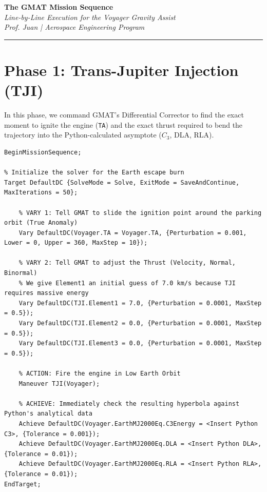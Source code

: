 \documentclass[11pt, letterpaper]{article}
\begin{document}
\begin{center}
    {\Large \textbf{The GMAT Mission Sequence}} \\
    \vspace{0.2cm}
    {\large \textit{Line-by-Line Execution for the Voyager Gravity Assist}} \\
    \vspace{0.4cm}
    \textit{Prof. Juan | Aerospace Engineering Program}
\end{center}
\hrule
\vspace{0.5cm}

\section*{Phase 1: Trans-Jupiter Injection (TJI)}
In this phase, we command GMAT's Differential Corrector to find the exact moment to ignite the engine (\texttt{TA}) and the exact thrust required to bend the trajectory into the Python-calculated asymptote ($C_3$, DLA, RLA).

\begin{lstlisting}
BeginMissionSequence;

% Initialize the solver for the Earth escape burn
Target DefaultDC {SolveMode = Solve, ExitMode = SaveAndContinue, MaxIterations = 50};
    
    % VARY 1: Tell GMAT to slide the ignition point around the parking orbit (True Anomaly)
    Vary DefaultDC(Voyager.TA = Voyager.TA, {Perturbation = 0.001, Lower = 0, Upper = 360, MaxStep = 10});
    
    % VARY 2: Tell GMAT to adjust the Thrust (Velocity, Normal, Binormal)
    % We give Element1 an initial guess of 7.0 km/s because TJI requires massive energy
    Vary DefaultDC(TJI.Element1 = 7.0, {Perturbation = 0.0001, MaxStep = 0.5});
    Vary DefaultDC(TJI.Element2 = 0.0, {Perturbation = 0.0001, MaxStep = 0.5});
    Vary DefaultDC(TJI.Element3 = 0.0, {Perturbation = 0.0001, MaxStep = 0.5});

    % ACTION: Fire the engine in Low Earth Orbit
    Maneuver TJI(Voyager);

    % ACHIEVE: Immediately check the resulting hyperbola against Python's analytical data
    Achieve DefaultDC(Voyager.EarthMJ2000Eq.C3Energy = <Insert Python C3>, {Tolerance = 0.001});
    Achieve DefaultDC(Voyager.EarthMJ2000Eq.DLA = <Insert Python DLA>, {Tolerance = 0.01});
    Achieve DefaultDC(Voyager.EarthMJ2000Eq.RLA = <Insert Python RLA>, {Tolerance = 0.01});
EndTarget;
\end{lstlisting}
\end{document}
